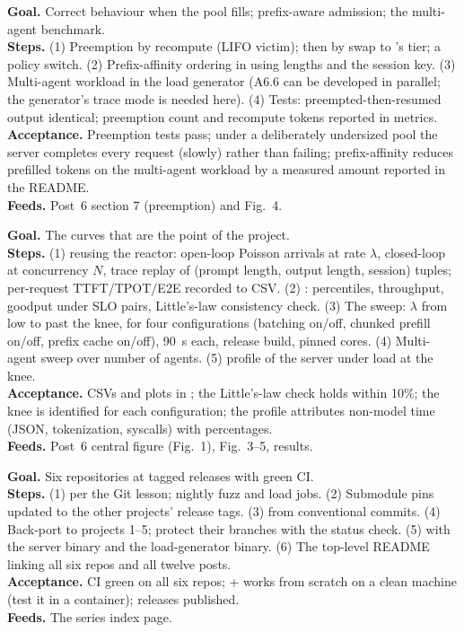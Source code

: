 \textbf{Goal.} Correct behaviour when the pool fills; prefix-aware admission; the multi-agent benchmark.\\
\textbf{Steps.} (1) Preemption by recompute (LIFO victim); then by swap to 's tier; a policy switch. (2) Prefix-affinity ordering in  using  lengths and the session key. (3) Multi-agent workload in the load generator (A6.6 can be developed in parallel; the generator's trace mode is needed here). (4) Tests: preempted-then-resumed output identical; preemption count and recompute tokens reported in metrics.\\
\textbf{Acceptance.} Preemption tests pass; under a deliberately undersized pool the server completes every request (slowly) rather than failing; prefix-affinity reduces prefilled tokens on the multi-agent workload by a measured amount reported in the README.\\
\textbf{Feeds.} Post~6 section 7 (preemption) and Fig.~4.

\textbf{Goal.} The curves that are the point of the project.\\
\textbf{Steps.} (1)  reusing the reactor: open-loop Poisson arrivals at rate $\lambda$, closed-loop at concurrency $N$, trace replay of (prompt length, output length, session) tuples; per-request TTFT/TPOT/E2E recorded to CSV. (2) : percentiles, throughput, goodput under SLO pairs, Little's-law consistency check. (3) The sweep: $\lambda$ from low to past the knee, for four configurations (batching on/off, chunked prefill on/off, prefix cache on/off), 90~s each, release build, pinned cores. (4) Multi-agent sweep over number of agents. (5)  profile of the server under load at the knee.\\
\textbf{Acceptance.} CSVs and plots in ; the Little's-law check holds within 10\%; the knee is identified for each configuration; the profile attributes non-model time (JSON, tokenization, syscalls) with percentages.\\
\textbf{Feeds.} Post~6 central figure (Fig.~1), Fig.~3--5, results.

\textbf{Goal.} Six repositories at tagged releases with green CI.\\
\textbf{Steps.} (1)  per the Git lesson; nightly fuzz and load jobs. (2) Submodule pins updated to the other projects' release tags. (3)  from conventional commits. (4) Back-port  to projects 1--5; protect their  branches with the status check. (5)  with the server binary and the load-generator binary. (6) The top-level  README linking all six repos and all twelve posts.\\
\textbf{Acceptance.} CI green on all six repos;  +  works from scratch on a clean machine (test it in a container); releases published.\\
\textbf{Feeds.} The series index page.

